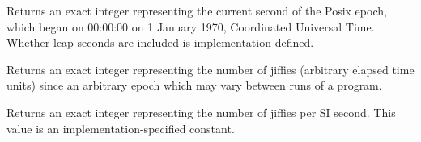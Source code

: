 \begin{entry}{%
}

Returns an exact integer representing the current second of the Posix
epoch, which began on 00:00:00 on 1 January 1970, Coordinated
Universal Time.  Whether leap seconds are included is
implementation-defined.
\end{entry}

\begin{entry}{%
}

Returns an exact integer representing the number of jiffies (arbitrary
elapsed time units) since an arbitrary epoch which may vary between
runs of a program.
\end{entry}

\begin{entry}{%
}

Returns an exact integer representing the number of jiffies per SI
second. This value is an implementation-specified constant.
\end{entry}




